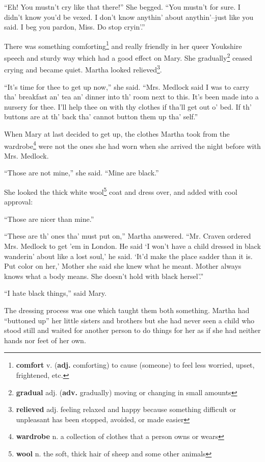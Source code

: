``Eh! You mustn't cry like that there!'' She begged. ``You mustn't for sure. I didn't know you'd be vexed. I don't know anythin' about anythin'--just like you said. I beg you pardon, Miss. Do stop cryin'.''

There was something comforting\footnote{\textbf{comfort} v. (\textbf{adj.} comforting) to cause (someone) to feel less worried, upset, frightened, etc.} and really friendly in her queer Youkshire speech and sturdy way which had a good effect on Mary. She gradually\footnote{\textbf{gradual} adj. (\textbf{adv.} gradually) moving or changing in small amounts} ceased crying and became quiet. Martha looked relieved\footnote{\textbf{relieved} adj. feeling relaxed and happy because something difficult or unpleasant has been stopped, avoided, or made easier}.

``It's time for thee to get up now,'' she said. ``Mrs. Medlock said I was to carry tha' breakfast an' tea an' dinner into th' room next to this. It's been made into a nursery for thee. I'll help thee on with thy clothes if tha'll get out o' bed. If th' buttons are at th' back tha' cannot button them up tha' self.''

When Mary at last decided to get up, the clothes Martha took from the wardrobe\footnote{\textbf{wardrobe} n. a collection of clothes that a person owns or wears} were not the ones she had worn when she arrived the night before with Mrs. Medlock.

``Those are not mine,'' she said. ``Mine are black.''

She looked the thick white wool\footnote{\textbf{wool} n. the soft, thick hair of sheep and some other animals} coat and dress over, and added with cool approval:

``Those are nicer than mine.''

``These are th' ones tha' must put on,'' Martha answered. ``Mr. Craven ordered Mrs. Medlock to get 'em in London. He said `I won't have a child dressed in black wanderin' about like a lost soul,' he said. `It'd make the place sadder than it is. Put color on her,' Mother she said she knew what he meant. Mother always knows what a body means. She doesn't hold with black hersel'.''

``I hate black things,'' said Mary.

The dressing process was one which taught them both something. Martha had ``buttoned up'' her little sisters and brothers but she had never seen a child who stood still and waited for another person to do things for her as if she had neither hands nor feet of her own.

